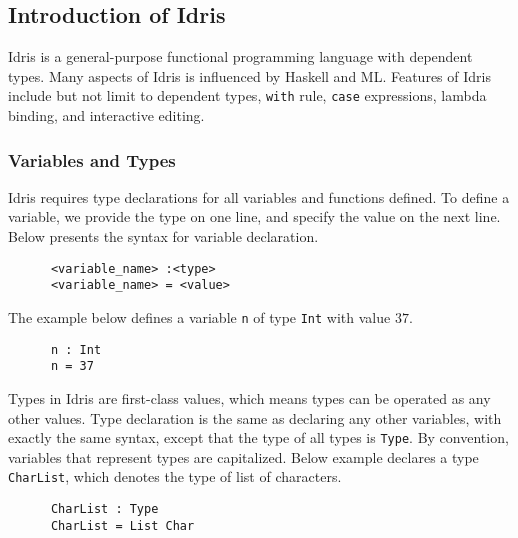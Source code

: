 \subsection{Introduction of Idris}
Idris is a general-purpose functional programming language with dependent types. Many aspects of Idris is influenced by Haskell and ML. Features of Idris include but not limit to dependent types, \texttt{with} rule, \texttt{case} expressions, lambda binding, and interactive editing. 

\subsubsection*{Variables and Types}
Idris requires type declarations for all variables and functions defined. To define a variable, we provide the type on one line, and specify the value on the next line. Below presents the syntax for variable declaration. 
\begin{lstlisting}
      <variable_name> :<type> 
      <variable_name> = <value>
\end{lstlisting}
The example below defines a variable \texttt{n} of type \texttt{Int} with value $37$. 
\begin{lstlisting}
      n : Int
      n = 37
\end{lstlisting}
Types in Idris are first-class values, which means types can be operated as any other values. Type declaration is the same as declaring any other variables, with exactly the same syntax, except that the type of all types is \texttt{Type}. By convention, variables that represent types are capitalized. Below example declares a type \texttt{CharList}, which denotes the type of list of characters. 
\begin{lstlisting}
      CharList : Type
      CharList = List Char
\end{lstlisting}


